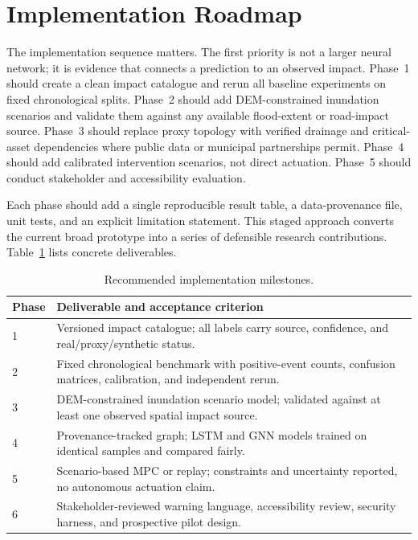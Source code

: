 \documentclass[journal]{IEEEtran}
\begin{document}
\section{Implementation Roadmap}
The implementation sequence matters. The first priority is not a larger neural network; it is evidence that connects a prediction to an observed impact. Phase~1 should create a clean impact catalogue and rerun all baseline experiments on fixed chronological splits. Phase~2 should add DEM-constrained inundation scenarios and validate them against any available flood-extent or road-impact source. Phase~3 should replace proxy topology with verified drainage and critical-asset dependencies where public data or municipal partnerships permit. Phase~4 should add calibrated intervention scenarios, not direct actuation. Phase~5 should conduct stakeholder and accessibility evaluation.

Each phase should add a single reproducible result table, a data-provenance file, unit tests, and an explicit limitation statement. This staged approach converts the current broad prototype into a series of defensible research contributions. Table~\ref{tab:milestones} lists concrete deliverables.

\begin{table}[t]
\caption{Recommended implementation milestones.}
\label{tab:milestones}
\centering\footnotesize
\begin{tabular}{p{}p{}}
\toprule
Phase & Deliverable and acceptance criterion \\
\midrule
1 & Versioned impact catalogue; all labels carry source, confidence, and real/proxy/synthetic status. \\
2 & Fixed chronological benchmark with positive-event counts, confusion matrices, calibration, and independent rerun. \\
3 & DEM-constrained inundation scenario model; validated against at least one observed spatial impact source. \\
4 & Provenance-tracked graph; LSTM and GNN models trained on identical samples and compared fairly. \\
5 & Scenario-based MPC or replay; constraints and uncertainty reported, no autonomous actuation claim. \\
6 & Stakeholder-reviewed warning language, accessibility review, security harness, and prospective pilot design. \\
\bottomrule
\end{tabular}
\end{table}
\end{document}
